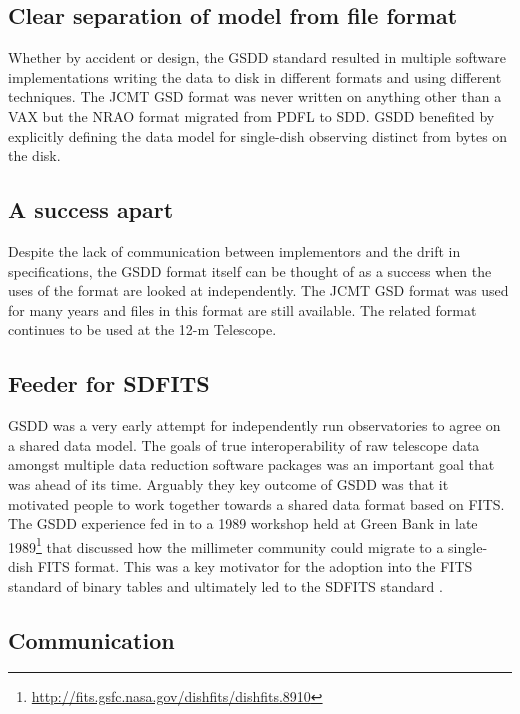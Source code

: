 \documentclass[final,authoryear,5p,times,twocolumn]{elsarticle}
\begin{document}
\subsection{Clear separation of model from file format}

Whether by accident or design, the GSDD standard resulted in multiple
software implementations writing the data to disk in different formats
and using different techniques. The JCMT GSD format was never written
on anything other than a VAX but the NRAO format migrated from PDFL to
SDD. GSDD benefited by explicitly defining the data model for
single-dish observing distinct from bytes on the disk.

\subsection{A success apart}

Despite the lack of communication between implementors and the drift
in specifications, the GSDD format itself can be thought of as a
success when the uses of the format are looked at independently. The JCMT GSD
format was used for many years and files in this format are still
available. The related format continues to be used at the 12-m Telescope.


\subsection{Feeder for SDFITS}
\label{sec:sdfits}

GSDD was a very early attempt for independently run observatories to
agree on a shared data model. The goals of true interoperability of
raw telescope data amongst multiple data reduction software packages
was an important goal that was ahead of its time. Arguably they key
outcome of GSDD was that it motivated people to work together towards
a shared data format based on FITS. The GSDD experience fed in to a
1989 workshop held at Green Bank in late
1989\footnote{\url{http://fits.gsfc.nasa.gov/dishfits/dishfits.8910}}
that discussed how the millimeter community could migrate to a
single-dish FITS format. This was a key motivator for the adoption
into the FITS standard of binary tables \citep{1995A&AS..113..159C}
and ultimately led to the SDFITS standard \citep{2000ASPC..216..243G}.

\subsection{Communication}
\end{document}
